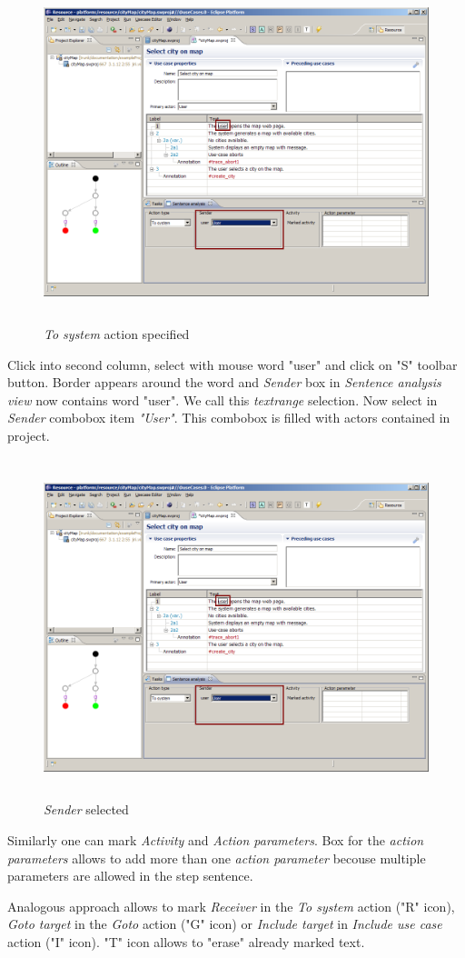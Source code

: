 \begin{figure}[ht]
  \centering
  \includegraphics[height=280pt]{images/manual-analysis/step1-action-selected}
  \caption{\emph{To system} action specified}
  \label{fig:reprotoolUCEditor}
\end{figure}

Click into second column, select with mouse word "user" and click on "S" toolbar button. Border appears around the word and \emph{Sender} box in \emph{Sentence analysis view} now contains word "user". We call this \emph{textrange} selection. Now select in \emph{Sender} combobox item \emph{"User"}. This combobox is filled with actors contained in project.

\begin{figure}[ht]
  \centering
  \includegraphics[height=280pt]{images/manual-analysis/step1-sender-selected}
  \caption{\emph{Sender} selected}
  \label{fig:reprotoolUCEditor}
\end{figure}

Similarly one can mark \emph{Activity} and \emph{Action parameters}. Box for the \emph{action parameters} allows to add more than one \emph{action parameter} becouse multiple parameters are
allowed in the step sentence. 

Analogous approach allows to mark \emph{Receiver} in the \emph{To system} action ("R" icon), \emph{Goto target} in the \emph{Goto} action ("G" icon) or \emph{Include target} in \emph{Include use case} action ("I" icon). "T" icon allows to "erase" already marked text.
